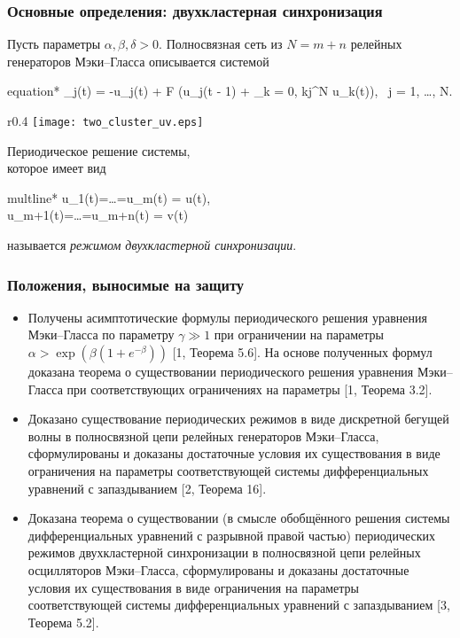 \begin{frame}
	\frametitle{Основные определения: двухкластерная синхронизация}
	
	Пусть параметры $\alpha, \beta, \delta > 0$. Полносвязная сеть из $N = m + n$ релейных генераторов Мэки--Гласса описывается системой
	\small	
	\begin{empheq}[box=\myeq]{equation*}
		_j(t) = -\beta u_j(t) + \alpha F \bigg(u_j(t - 1) + \delta \sum\limits_{k = 0, k\neq j}^N u_k(t)\bigg), \ j = 1, \dots, N.
	\end{empheq}
	\normalsize
	
	\begin{wrapfigure}{r}{0.4\textwidth} 
		\vspace{-22pt} 
		\centering
		\texttt{[image: two\_cluster\_uv.eps]}
	\end{wrapfigure}
	
	Периодическое решение системы, \\которое имеет вид 
	\small	
	\begin{empheq}[box=\myeq]{multline*}
		u_1(t)=\ldots=u_m(t) = u(t),\\u_{m+1}(t)=\ldots=u_{m+n}(t) = v(t)
	\end{empheq}
	\normalsize
	называется \emph{режимом двухкластерной синхронизации}.

\end{frame}

\begin{frame}
    \frametitle{Положения, выносимые на защиту}

	\small
    \begin{itemize}
    	\item Получены асимптотические формулы периодического решения уравнения Мэки--Гласса по параметру $\gamma \gg 1$ при ограничении на параметры $\alpha > \exp\left(\beta(1 + e^{-\beta})\right)$ [1, Теорема 5.6]. На основе полученных формул доказана теорема о существовании периодического решения уравнения Мэки--Гласса при соответствующих ограничениях на параметры [1, Теорема 3.2].
    	\item Доказано существование периодических режимов в виде дискретной бегущей волны в полносвязной цепи релейных генераторов Мэки--Гласса, сформулированы и доказаны достаточные условия их существования в виде ограничения на параметры соответствующей системы дифференциальных уравнений с запаздыванием [2, Теорема 16].
    	\item Доказана теорема о существовании (в смысле обобщённого решения системы дифференциальных уравнений с разрывной правой частью) периодических режимов двухкластерной синхронизации в полносвязной цепи релейных осцилляторов Мэки--Гласса, сформулированы и доказаны достаточные условия их существования в виде ограничения на параметры соответствующей системы дифференциальных уравнений с запаздыванием [3, Теорема 5.2].
    \end{itemize}
    \normalsize
\end{frame}

